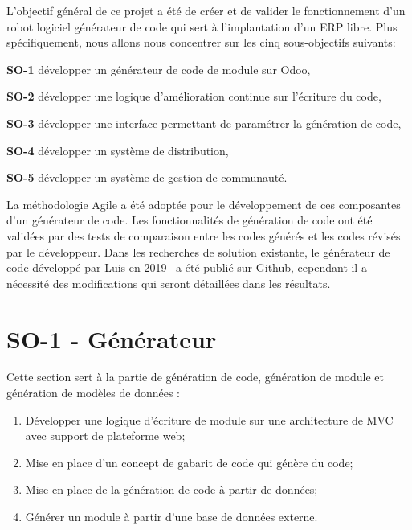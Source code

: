 \label{sec:Theme1} \label{chapitre_methode}

L’objectif général de ce projet a été de créer et de valider le fonctionnement d’un robot logiciel générateur de code qui sert à l’implantation d’un ERP libre. Plus spécifiquement, nous allons nous concentrer sur les cinq sous-objectifs suivants:

\textbf{SO-1} développer un générateur de code de module sur Odoo,

\textbf{SO-2} développer une logique d'amélioration continue sur l'écriture du code,

\textbf{SO-3} développer une interface permettant de paramétrer la génération de code,

\textbf{SO-4} développer un système de distribution,

\textbf{SO-5} développer un système de gestion de communauté.

La méthodologie Agile a été adoptée pour le développement de ces composantes d'un générateur de code. Les fonctionnalités de génération de code ont été validées par des tests de comparaison entre les codes générés et les codes révisés par le développeur. Dans les recherches de solution existante, le générateur de code développé par Luis en 2019~\cite{bluiksnot_repo} a été publié sur Github, cependant il a nécessité des modifications qui seront détaillées dans les résultats.


\section{SO-1 - Générateur}
Cette section sert à la partie de génération de code, génération de module et génération de modèles de données :
\begin{enumerate}
    \item Développer une logique d’écriture de module sur une architecture de MVC avec support de plateforme web;
    \item Mise en place d’un concept de gabarit de code qui génère du code;
    \item Mise en place de la génération de code à partir de données;
    \item Générer un module à partir d’une base de données externe.
\end{enumerate}

